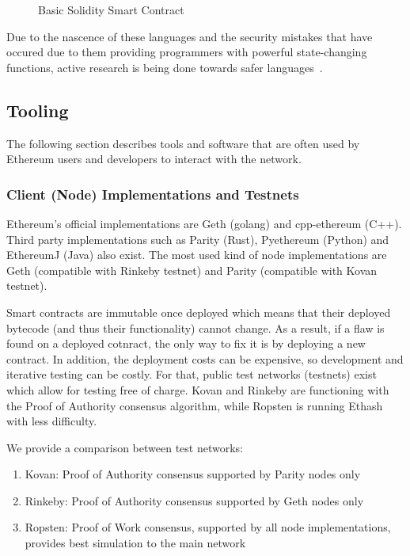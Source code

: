\begin{figure}[ht]
    \centering
    
    \caption{Basic Solidity Smart Contract}
    \label{fig:smart_contract}
\end{figure}

Due to the nascence of these languages and the security mistakes that have occured due to them providing programmers with powerful state-changing functions, active research is being done towards safer languages~\cite{bamboo}.

\subsection{Tooling}
The following section describes tools and software that are often used by Ethereum users and developers to interact with the network.

\subsubsection{Client (Node) Implementations and Testnets}
Ethereum's official implementations are Geth (golang) and cpp-ethereum (C++). Third party implementations such as Parity (Rust), Pyethereum (Python) and EthereumJ (Java) also exist. The most used kind of node implementations are Geth (compatible with Rinkeby testnet) and Parity (compatible with Kovan testnet). 

Smart contracts are immutable once deployed which means that their deployed bytecode (and thus their functionality) cannot change. As a result, if a flaw is found on a deployed cotnract, the only way to fix it is by deploying a new contract. In addition, the deployment costs can be expensive, so development and iterative testing can be costly. For that, public test networks (testnets) exist which allow for testing free of charge. Kovan and Rinkeby are functioning with the Proof of Authority \cite{poa} consensus algorithm, while Ropsten is running Ethash \cite{ethash} with less difficulty.

We provide a comparison between test networks:
\begin{enumerate}
    \item Kovan: Proof of Authority consensus supported by Parity nodes only
    \item Rinkeby: Proof of Authority consensus supported by Geth nodes only
    \item Ropsten: Proof of Work consensus, supported by all node implementations, provides best simulation to the main network 
\end{enumerate}

